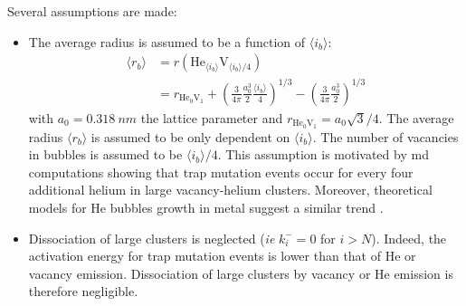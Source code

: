Several assumptions are made:
\begin{itemize}
    \item The average radius is assumed to be a function of $\langle i_b \rangle$:
    \begin{equation}
        \begin{split}
            \langle r_b \rangle &= r(\mathrm{He}_{\langle i_b \rangle}\mathrm{V}_{\langle i_b \rangle/4}) \\
            &= r_{\mathrm{He}_0 \mathrm{V}_1} + \left(\frac{3}{4 \pi} \frac{a_0^3}{2} \frac{\langle i_b \rangle}{4} \right)^{1/3} - \left(\frac{3}{4 \pi} \frac{a_0^3}{2} \right)^{1/3}
        \end{split}
        \label{eq: radius average}
    \end{equation}
    with $a_0 = \SI{0.318}{nm}$ the lattice parameter and $r_{\mathrm{He}_0 \mathrm{V}_1} =  a_0 \sqrt{3}/4$.
    The average radius $\langle r_b \rangle$ is assumed to be only dependent on $\langle i_b \rangle$.
    The number of vacancies in bubbles is assumed to be $\langle i_b \rangle/4$.
    This assumption is motivated by \gls{md} computations showing that \gls{trap mutation} events occur for every four additional helium in large \gls{vacancy}-helium clusters.
    Moreover, theoretical models for He bubbles growth in metal suggest a similar trend .
    \item Dissociation of large clusters is neglected (\textit{ie} $k_i^- = 0$ for $i>N$).
    Indeed, the activation energy for \gls{trap mutation} events is lower than that of He or \gls{vacancy} emission. Dissociation of large clusters by \gls{vacancy} or He emission is therefore negligible.
\end{itemize}

